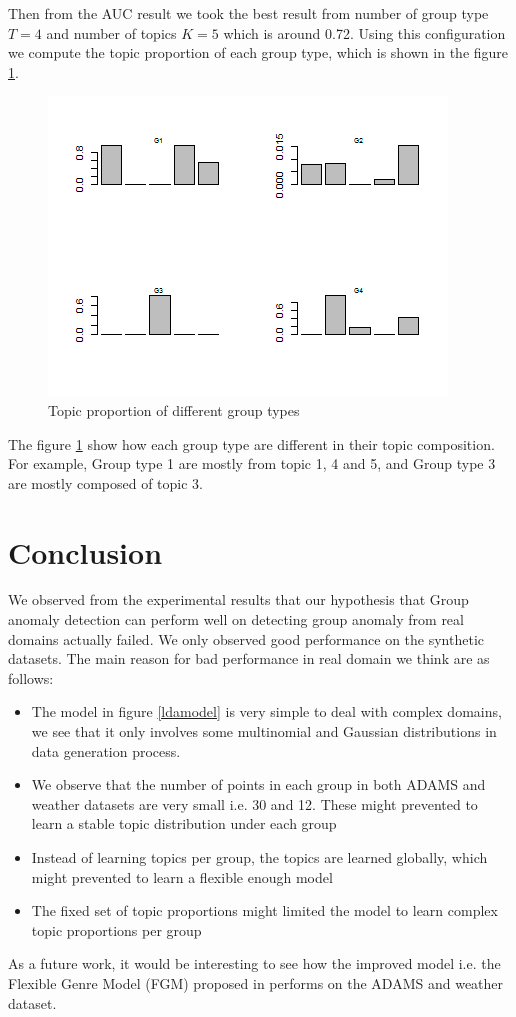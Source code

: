 \documentclass[letterpaper]{article}
\begin{document}
Then from the AUC result we took the best result from number of group type $T=4$ and number of topics $K=5$ which is around 0.72. Using this configuration we compute the topic proportion of each group type, which is shown in the figure \ref{weathertopicprop}.

\begin{figure}
\includegraphics[scale=0.6]{topicprop.png}
\caption{Topic proportion of different group types}
\label{weathertopicprop}
\end{figure}

The figure \ref{weathertopicprop} show how each group type are different in their topic composition. For example, Group type 1 are mostly from topic 1, 4 and 5, and Group type 3 are mostly composed of topic 3.

\section{Conclusion}\label{sec:conclusion}
We observed from the experimental results that our hypothesis that Group anomaly detection can perform well on detecting group anomaly from real domains actually failed. We only observed good performance on the synthetic datasets. The main reason for bad performance in real domain we think are as follows:
\begin{itemize}
\item The model in figure \ref{ldamodel} is very simple to deal with complex domains, we see that it only involves some multinomial and Gaussian distributions in data generation process.
\item We observe that the number of points in each group in both ADAMS and weather datasets are very small i.e. 30 and 12. These might prevented to learn a stable topic distribution under each group
\item Instead of learning topics per group, the topics are learned globally, which might prevented to learn a flexible enough model
\item The fixed set of topic proportions might limited the model to learn complex topic proportions per group
\end{itemize}
As a future work, it would be interesting to see how the improved model i.e. the Flexible Genre Model (FGM) proposed in \cite{xiong2011group} performs on the ADAMS and weather dataset.


\end{document}
